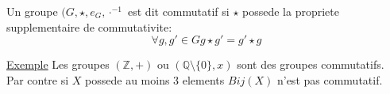 \documentclass[../main.tex]{subfiles}
\begin{document}
\begin{defn}\label{defn:groupes_commutatifs}
	Un groupe $(G, \star, e_G, \cdot^{-1}$ est dit commutatif si $\star$ possede la propriete supplementaire de commutativite:
	\[ 
	\forall g, g' \in G  g\star g' = g' \star g
	\]
	
\end{defn}
\underline{Exemple} Les groupes $(\mathbb{Z},+)$ ou $(\mathbb{Q}\setminus \{0\},x)$ sont des groupes commutatifs.\\
Par contre si $X$ possede au moins 3 elements $Bij(X)$ n'est pas commutatif.


	
\end{document}
